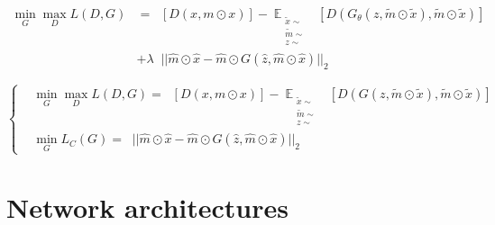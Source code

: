 \documentclass{article}
\begin{document}
			\begin{align}
		\min_G \max_D L(D, G)  &= \mathop{\mathbb{{E}}_{\substack{
					x \sim \mathop{\mathbb{{P}}_{r}} \\
					m \sim \mathop{\mathbb{{P}}_{m}}
		}}} [D(x, m\odot x)] 
		- \mathop{\mathbb{{E}}}_{\substack{
				\tilde{x} \sim \mathop{\mathbb{{P}}_{r}} \\
				\tilde{m} \sim \mathop{\mathbb{{P}}_{m} }\\
				z \sim \mathop{\mathbb{{P}}_{z} }
		}} [D(G_\theta(z, \tilde{m}\odot\tilde{x}), \tilde{m}\odot\tilde{x})]   \nonumber \\
		& + \lambda \mathop{\mathbb{{E}}_{\substack{
					\hat{x} \sim \mathop{\mathbb{{P}}_{r}} \\
					\hat{z} \sim \mathop{\mathbb{{P}}_{z}}\\
					\hat{m} \sim \mathop{\mathbb{{P}}_{z}} \\	
		}}} || \hat{m} \odot \hat{x} - \hat{m} \odot G(\hat{z}, \hat{m} \odot \hat{x}) ||_2
		\end{align}
		
		\begin{equation}
			\left\{  \begin{split}
			& \min_G \max_D L(D, G)  = \mathop{\mathbb{{E}}_{\substack{
						x \sim \mathop{\mathbb{{P}}_{r}} \\
						m \sim \mathop{\mathbb{{P}}_{m}}
			}}} [D(x, m\odot x)] 
			- \mathop{\mathbb{{E}}}_{\substack{
					\tilde{x} \sim \mathop{\mathbb{{P}}_{r}} \\
					\tilde{m} \sim \mathop{\mathbb{{P}}_{m} }\\
					z \sim \mathop{\mathbb{{P}}_{z} }
			}} [D(G(z, \tilde{m}\odot\tilde{x}), \tilde{m}\odot \tilde{x})] \\
			& \min_G L_C(G) = \mathop{\mathbb{{E}}_{\substack{
						\hat{x} \sim \mathop{\mathbb{{P}}_{r}} \\
						\hat{z} \sim \mathop{\mathbb{{P}}_{z}}\\
						\hat{m} \sim \mathop{\mathbb{{P}}_{z}} \\	
			}}} || \hat{m} \odot \hat{x} - \hat{m} \odot G(\hat{z}, \hat{m} \odot \hat{x}) ||_2
			\end{split}\right.
	\end{equation}		

\section{Network architectures}
\end{document}
